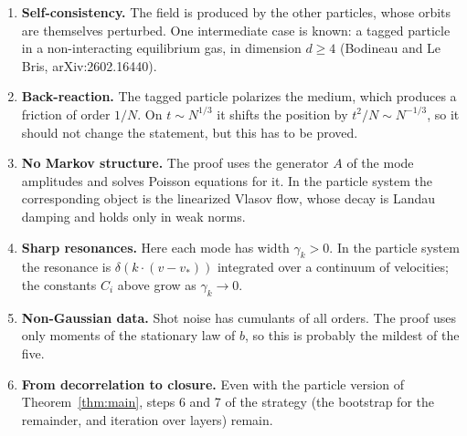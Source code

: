 \documentclass[11pt]{article}
\theoremstyle{remark}
\begin{document}
\begin{enumerate}
  \item \textbf{Self-consistency.} The field is produced by the other
    particles, whose orbits are themselves perturbed. One intermediate case
    is known: a tagged particle in a non-interacting equilibrium gas, in
    dimension $d\ge4$ (Bodineau and Le Bris, arXiv:2602.16440).
  \item \textbf{Back-reaction.} The tagged particle polarizes the medium,
    which produces a friction of order $1/N$. On $t\sim N^{1/3}$ it shifts
    the position by $t^2/N\sim N^{-1/3}$, so it should not change the
    statement, but this has to be proved.
  \item \textbf{No Markov structure.} The proof uses the generator $A$ of
    the mode amplitudes and solves Poisson equations for it. In the particle
    system the corresponding object is the linearized Vlasov flow, whose
    decay is Landau damping and holds only in weak norms.
  \item \textbf{Sharp resonances.} Here each mode has width $\gamma_k>0$. In
    the particle system the resonance is $\delta(k\cdot(v-v_*))$ integrated
    over a continuum of velocities; the constants $C_i$ above grow as
    $\gamma_k\to0$.
  \item \textbf{Non-Gaussian data.} Shot noise has cumulants of all orders.
    The proof uses only moments of the stationary law of $b$, so this is
    probably the mildest of the five.
  \item \textbf{From decorrelation to closure.} Even with the particle
    version of Theorem~\ref{thm:main}, steps 6 and 7 of the strategy (the
    bootstrap for the remainder, and iteration over layers) remain.
\end{enumerate}
\end{document}
